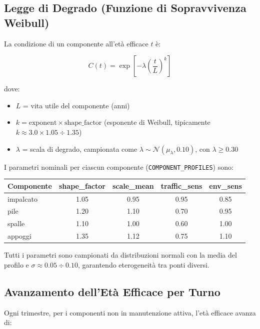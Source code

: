 \documentclass[11pt,a4paper]{article}
\begin{document}
\subsection{Legge di Degrado (Funzione di Sopravvivenza Weibull)}

La condizione di un componente all'et\`a efficace $t$ \`e:

\begin{equation}
  C(t) = \exp\!\left[-\lambda \left(\frac{t}{L}\right)^k\right]
\end{equation}

dove:
\begin{itemize}
  \item $L$ = vita utile del componente (anni)
  \item $k = \text{exponent} \times \text{shape\_factor}$ (esponente di Weibull, tipicamente $k \approx 3.0 \times 1.05 \div 1.35$)
  \item $\lambda$ = scala di degrado, campionata come $\lambda \sim \mathcal{N}(\mu_\lambda, 0.10)$, con $\lambda \geq 0.30$
\end{itemize}

I parametri nominali per ciascun componente (\texttt{COMPONENT\_PROFILES}) sono:

\begin{center}
\begin{tabular}{lcccc}
\toprule
\textbf{Componente} & \textbf{shape\_factor} & \textbf{scale\_mean} & \textbf{traffic\_sens} & \textbf{env\_sens} \\
\midrule
impalcato & 1.05 & 0.95 & 0.95 & 0.85 \\
pile      & 1.20 & 1.10 & 0.70 & 0.95 \\
spalle    & 1.10 & 1.00 & 0.60 & 1.00 \\
appoggi   & 1.35 & 1.12 & 0.75 & 1.10 \\
\bottomrule
\end{tabular}
\end{center}

Tutti i parametri sono campionati da distribuzioni normali con la media del profilo e $\sigma \approx 0.05\div0.10$, garantendo eterogeneità tra ponti diversi.

\subsection{Avanzamento dell'Età Efficace per Turno}

Ogni trimestre, per i componenti non in manutenzione attiva, l'età efficace avanza di:
\end{document}
